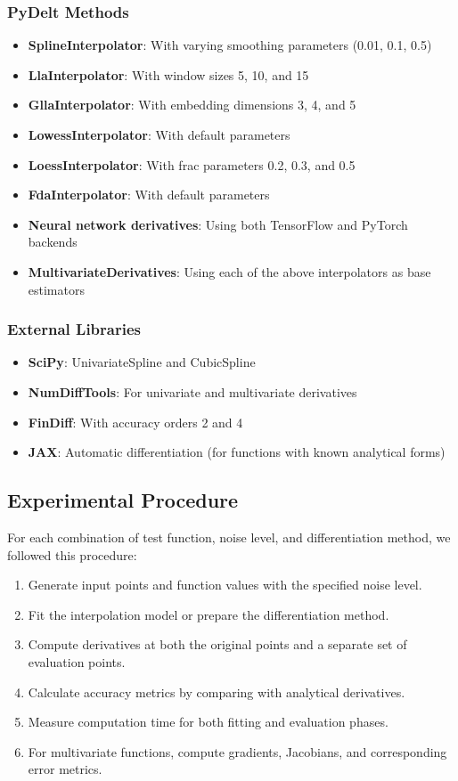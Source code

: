 \documentclass[11pt,a4paper]{article}
\begin{document}
\subsubsection{PyDelt Methods}
\begin{itemize}
    \item \textbf{SplineInterpolator}: With varying smoothing parameters (0.01, 0.1, 0.5)
    \item \textbf{LlaInterpolator}: With window sizes 5, 10, and 15
    \item \textbf{GllaInterpolator}: With embedding dimensions 3, 4, and 5
    \item \textbf{LowessInterpolator}: With default parameters
    \item \textbf{LoessInterpolator}: With frac parameters 0.2, 0.3, and 0.5
    \item \textbf{FdaInterpolator}: With default parameters
    \item \textbf{Neural network derivatives}: Using both TensorFlow and PyTorch backends
    \item \textbf{MultivariateDerivatives}: Using each of the above interpolators as base estimators
\end{itemize}

\subsubsection{External Libraries}
\begin{itemize}
    \item \textbf{SciPy}: UnivariateSpline and CubicSpline
    \item \textbf{NumDiffTools}: For univariate and multivariate derivatives
    \item \textbf{FinDiff}: With accuracy orders 2 and 4
    \item \textbf{JAX}: Automatic differentiation (for functions with known analytical forms)
\end{itemize}

\subsection{Experimental Procedure}

For each combination of test function, noise level, and differentiation method, we followed this procedure:

\begin{enumerate}
    \item Generate input points and function values with the specified noise level.
    \item Fit the interpolation model or prepare the differentiation method.
    \item Compute derivatives at both the original points and a separate set of evaluation points.
    \item Calculate accuracy metrics by comparing with analytical derivatives.
    \item Measure computation time for both fitting and evaluation phases.
    \item For multivariate functions, compute gradients, Jacobians, and corresponding error metrics.
\end{enumerate}
\end{document}

